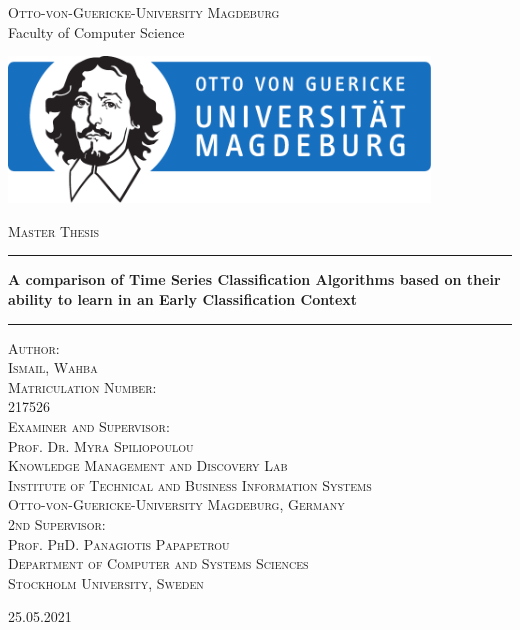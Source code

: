
\begin{titlepage}

\begin{center}
\textsc{\normalsize {Otto-von-Guericke-University Magdeburg}} \\

Faculty of Computer Science \\
\vspace{1cm}

\includegraphics[width=11.2cm]{Figure/Signet_INF_1}
\vspace{1cm}

\textsc{\huge {Master Thesis}} \\
\vspace{0.95mm}

\rule{\linewidth}{0.3mm}
\large{\bfseries \huge A comparison of Time Series Classification Algorithms based on their ability to learn in an Early Classification Context}
\rule[0.3cm]{\linewidth}{0.3mm}

\textsc{\large {Author: \\Ismail, Wahba \\ }}
\vspace{4mm}
\textsc{\large {Matriculation Number: \\ 217526 \\ }}
\vspace{4mm}
\textsc{\large {Examiner and Supervisor: \\
Prof. Dr. Myra Spiliopoulou\\}}
\textsc{\normalsize  {Knowledge Management and Discovery Lab \\
Institute of Technical and Business Information Systems \\
Otto-von-Guericke-University Magdeburg, Germany}\\ }
\vspace{4mm}
\textsc{\large { 2nd Supervisor: \\
Prof. PhD. Panagiotis Papapetrou\\ }}
\textsc{\normalsize  { Department of Computer and Systems Sciences \\
Stockholm University, Sweden \\ }}
\vspace{6mm}

25.05.2021 



\end{center}

\end{titlepage}